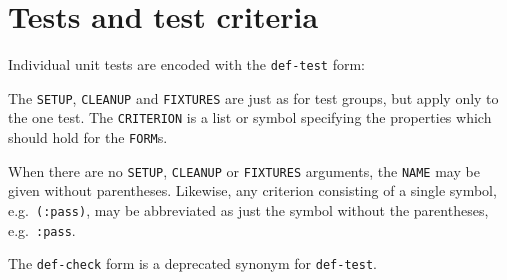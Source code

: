 
\section{Tests and test criteria}
Individual unit tests are encoded with the \texttt{def-test} form:

%
The \texttt{SETUP}, \texttt{CLEANUP} and \texttt{FIXTURES} are just as
for test groups, but apply only to the one test.  The
\texttt{CRITERION} is a list or symbol specifying the properties which
should hold for the \texttt{FORM}s.

When there are no \texttt{SETUP}, \texttt{CLEANUP} or
\texttt{FIXTURES} arguments, the \texttt{NAME} may be given without
parentheses.  Likewise, any criterion consisting of a single symbol,
e.g.\ \texttt{(:pass)}, may be abbreviated as just the symbol without
the parentheses, e.g.\ \texttt{:pass}.

The \texttt{def-check} form is a deprecated synonym for
\texttt{def-test}.

\def\criteriaGroup#1#2{\subsection{#1} #2}
\def\secText#1{#1}
\def\endcriteriaGroup{}
\def\manualOrRef#1#2{#1}
\def\criteriaDoc#1#2#3#4#5#6#7#8{%
\subsubsection{The \texttt{#2} criterion} 
#4\index{#1@\texttt{#2}}
\\ Syntax: \texttt{#3}
#7{#8}#6}
\def\noEx#1{}
\def\singleEx#1{\\Example: \texttt{#1}}
\def\multiEx#1{#1}
\def\passExample#1{\\Passing example: \texttt{#1}}
\def\failExample#1{\\Failing example: \texttt{#1}}
\def\tabbingEx#1{\\Example: \begin{tabbing}#1\end{tabbing}}
\def\noExpl{}
\def\hasExpl#1{\par#1}


